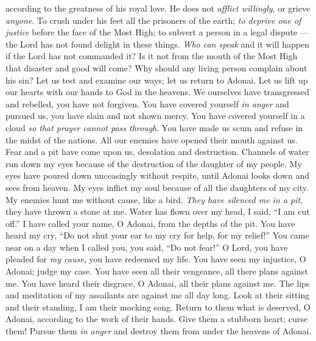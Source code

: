 \begin{biblechapter}
according to the greatness of his royal love.
\verse He does not \textit{afflict willingly}, 
or grieve \textit{anyone}.
\verse To crush under his feet 
all the prisoners of the earth;
\verse \textit{to deprive one of justice} 
before the face of the Most High;
\verse to subvert a person in a legal dispute 
—the Lord has not found delight in these things.
\verse \textit{Who can speak} and it will happen 
if the Lord has not commanded it?
\verse Is it not from the mouth of the Most High 
that disaster and good will come?
\verse Why should any living person complain 
about his sin?
\verse Let us test and examine our ways; 
let us return to Adonai.
\verse Let us lift up our hearts with our hands 
to God in the heavens.
\verse We ourselves have transgressed and rebelled, 
you have not forgiven.
\verse You have covered yourself \textit{in anger} and pursued us, 
you have slain and not shown mercy.
\verse You have covered yourself in a cloud 
\textit{so that prayer cannot pass through}.
\verse You have made us scum and refuse 
in the midst of the nations.
\verse All our enemies 
have opened their mouth against us.
\verse Fear and a pit have come upon us, 
desolation and destruction.
\verse Channels of water run down my eyes 
because of the destruction of the daughter of my people.
\verse My eyes have poured down unceasingly 
without respite,
\verse until Adonai looks down 
and sees from heaven.
\verse My eyes inflict my soul 
because of all the daughters of my city.
\verse My enemies hunt me without cause, 
like a bird.
\verse \textit{They have silenced me in a pit}, 
they have thrown a stone at me.
\verse Water has flown over my head, 
I said, “I am cut off.”
\verse I have called your name, O Adonai, 
from the depths of the pit.
\verse You have heard my cry, “Do not shut your ear 
to my cry for help, for my relief!”
\verse You came near on a day when I called you, 
you said, “Do not fear!”
\verse O Lord, you have pleaded for \textit{my cause}, 
you have redeemed my life.
\verse You have seen my injustice, O Adonai; 
judge my case.
\verse You have seen all their vengeance, 
all there plans against me.
\verse You have heard their disgrace, O Adonai, 
all their plans against me.
\verse The lips and meditation of my assailants 
are against me all day long.
\verse Look at their sitting and their standing, 
I am their mocking song.
\verse Return to them what is deserved, O Adonai, 
according to the work of their hands.
\verse Give them a stubborn heart; 
curse them!
\verse Pursue them \textit{in anger} and destroy them 
from under the heavens of Adonai.
\end{biblechapter}

